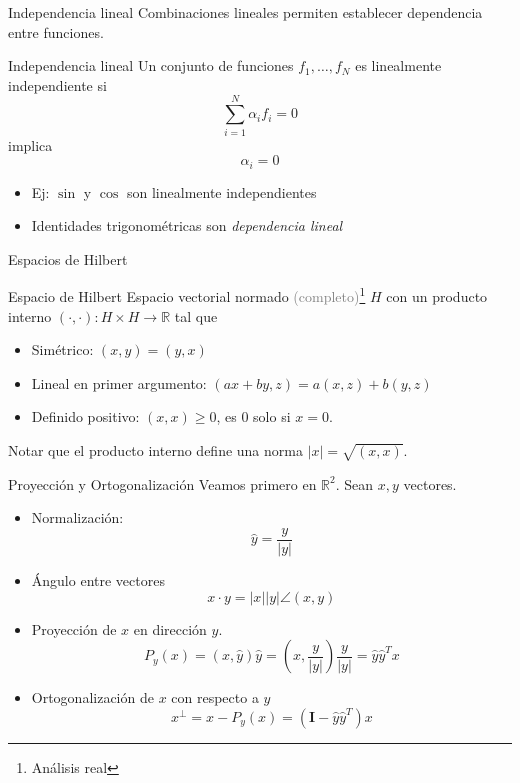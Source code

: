 \documentclass[12pt,aspectratio=169,xcolor=dvipsnames]{beamer}
\newcommand{\R}{\mathbb{R}}
\begin{document}
\begin{frame}{Independencia lineal}
    Combinaciones lineales permiten establecer dependencia entre funciones.
    \begin{block}{Independencia lineal}
        Un conjunto de funciones $f_1, \hdots, f_N$ es linealmente independiente si
          $$\sum_{i=1}^N \alpha_i f_i = 0 $$
          implica
          $$ \alpha_i = 0$$
    \end{block}
    \begin{itemize}
        \item<+-> Ej: $\sin$  y $\cos$ son linealmente independientes
        \item<+-> Identidades trigonométricas son \emph{dependencia lineal}
    \end{itemize}
\end{frame}
\begin{frame}{Espacios de Hilbert}
    \begin{block}{Espacio de Hilbert}
        Espacio vectorial normado \textcolor{gray}{(completo)}\footnote{Análisis real} $H$ con un producto interno $(\cdot,\cdot):H\times H\to \R$ tal que
        \begin{itemize}
            \item Simétrico: $(x,y) = (y,x)$
            \item Lineal en primer argumento: $(ax + by, z) = a(x,z) + b(y,z)$
            \item Definido positivo: $(x,x)\geq 0$, es 0 solo si $x=0$. 
        \end{itemize}
        Notar que el producto interno define una norma $|x| = \sqrt{(x,x)}$. 
    \end{block}
\end{frame}
\begin{frame}{Proyección y Ortogonalización}
    Veamos primero en $\R^2$. Sean $x,y$ vectores. 
    \begin{itemize}
        \item Normalización:
            $$ \hat y = \frac{y}{|y|} $$
        \item Ángulo entre vectores
            $$ x\cdot y = |x||y|\angle(x,y) $$
        \item Proyección de $x$ en dirección $y$.
            $$P_y(x) = (x, \hat y)\hat y = \left(x, \frac{y}{|y|}\right)\frac{y}{|y|} = \hat y\hat y^T x $$
        \item Ortogonalización de $x$ con respecto a $y$
            $$ x^\perp = x - P_y(x) = (\mathbf I - \hat y \hat y^T) x $$
    \end{itemize}
\end{frame}
\end{document}
